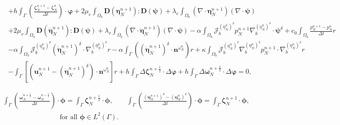 \documentclass[11pt]{article}
\newcommand{\bd}{\boldsymbol}
\theoremstyle{definition}
\begin{document}
\begin{small}
\begin{equation}
\begin{aligned}
\\
&+ h \int_{\Gamma} \left(\frac{\bd{\zeta}^{n + 1}_{N} - \bd{\zeta}^{n}_{N}}{\Delta t}\right) \cdot \bd{\varphi} + 2\mu_{e} \int_{\Omega_{b}} \boldsymbol{D}(\boldsymbol{\eta}^{n + 1}_{N}) : \boldsymbol{D}(\boldsymbol{\psi}) + \lambda_{e} \int_{\Omega_{b}} (\nabla \cdot \boldsymbol{\eta}^{n + 1}_{N})(\nabla \cdot \boldsymbol{\psi}) 
\\
&+ 2\mu_{v} \int_{\Omega_{b}} \bd{D}(\dot{\bd{\eta}}^{n + 1}_{N}) : \bd{D}(\bd{\psi}) + \lambda_{v} \int_{\Omega_{b}} (\nabla \cdot \dot{\bd{\eta}}^{n + 1}_{N}) (\nabla \cdot \bd{\psi}) - \alpha \int_{\Omega_{b}} \mathcal{J}^{(\eta^{n}_{N})^{\delta}}_{b} p^{n + 1}_{N} \nabla^{(\eta^{n}_{N})^{\delta}}_{b} \cdot \boldsymbol{\psi}^{\delta} + c_{0}  \int_{\Omega_{b}} \frac{p^{n + 1}_{N} - p^{n}_{N}}{\Delta t} r \\
&- \alpha \int_{\Omega_{b}} \mathcal{J}^{(\eta^{n}_{N})^{\delta}}_{b} \left(\boldsymbol{\dot{\eta}}^{n + 1}_{N}\right)^{\delta} \cdot \nabla^{(\eta^{n}_{N})^{\delta}}_{b} r - \alpha \int_{\Gamma} \left(\left(\boldsymbol{\dot{\eta}}^{n + 1}_{N}\right)^{\delta} \cdot \boldsymbol{n}^{\omega^{n}_{N}}\right) r + \kappa \int_{\Omega_{b}} \mathcal{J}^{(\eta^{n}_{N})^{\delta}}_{b} \nabla^{(\eta^{n}_{N})^{\delta}}_{b} p^{n + 1}_{N} \cdot \nabla^{(\eta^{n}_{N})^{\delta}}_{b} r \\
&- \int_{\Gamma} \left[\left(\boldsymbol{u}^{n + 1}_{N} - \left(\boldsymbol{\dot{\eta}}^{n + 1}_{N}\right)^{\delta}\right) \cdot \boldsymbol{n}^{\omega^{n}_{N}}\right]r + h \int_{\Gamma} \Delta \bd{\zeta}^{n + \frac{1}{2}}_{N} \cdot \Delta \bd{\varphi} + h \int_{\Gamma} \Delta \bd{\omega}^{n + \frac{1}{2}}_{N} \cdot \Delta \bd{\varphi} = 0,
\end{aligned}
\end{equation}
\end{small}

\begin{multline*}
\int_{\Gamma} \left(\frac{\bd{\omega}^{n + \frac{1}{2}}_{N} - \bd{\omega}^{n - \frac{1}{2}}_{N}}{\Delta t}\right) \cdot \bd{\phi} = \int_{\Gamma} \bd{\zeta}^{n + \frac{1}{2}}_{N} \cdot \bd{\phi}, \qquad \int_{\Gamma} \left(\frac{(\bd{\eta}^{n + 1}_{N})^{\delta} - (\bd{\eta}^{n}_{N})^{\delta}}{\Delta t}\right) \cdot \bd{\phi} = \int_{\Gamma} \bd{\zeta}^{n + 1}_{N} \cdot \bd{\phi}, \\
\qquad \qquad \qquad \qquad \text{ for all } \bd{\phi} \in L^{2}(\Gamma).
\end{multline*}
\end{document}

